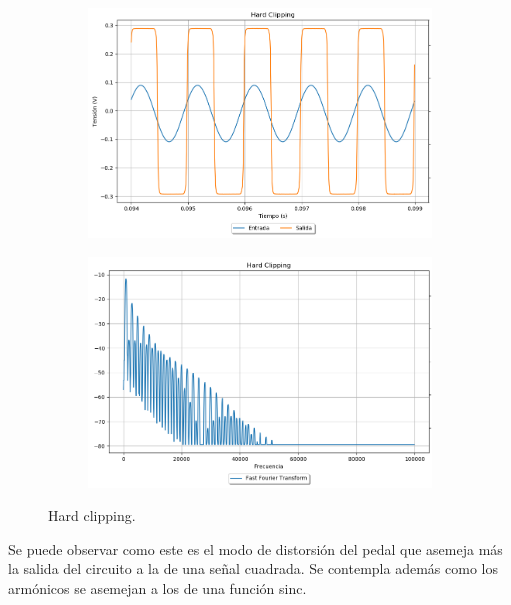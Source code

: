 \begin{figure}[H]
\hspace{-7.5em}
	\begin{subfigure}{0.5\textwidth}
		\includegraphics[width=1.5\textwidth, trim={0 0 0 0}, clip]{Ejercicio5/Imagenes/Propuesto/Mediciones/hard1.png}
		\label{fig:prop_hard}
	\end{subfigure}
	\hspace{6em}
	\begin{subfigure}{0.5\textwidth}
		\includegraphics[width=1.5\textwidth, trim={0 0 0 0}, clip]{Ejercicio5/Imagenes/Propuesto/Mediciones/hardfft1.png}
		\centering
		\label{fig:prop_hardfft}
	\end{subfigure}
	\caption{Hard clipping.}
\end{figure}

Se puede observar como este es el modo de distorsión del pedal que asemeja más la salida del circuito a la de una señal cuadrada. Se contempla además como los armónicos se asemejan a los de una función sinc.

